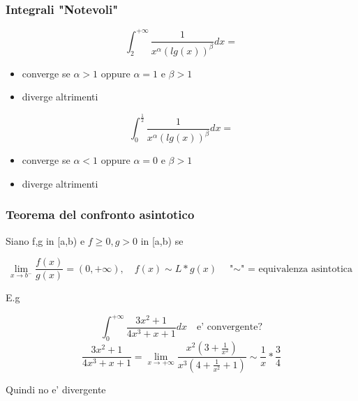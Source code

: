\documentclass{article}
\begin{document}
          \subsubsection{Integrali "Notevoli"}
          \begin{equation*}
            \int^{+\infty}_2 \frac{1}{x^{\alpha}(lg(x))^{\beta}}dx=
          \end{equation*}
          \begin{itemize}
            \item converge se $\alpha>1$ oppure $\alpha=1$ e $\beta>1$
            \item diverge altrimenti
          \end{itemize}
          \begin{equation*}
            \int^{\frac{1}{2}}_0 \frac{1}{x^{\alpha}(lg(x))^{\beta}}dx=
          \end{equation*}
          \begin{itemize}
            \item converge se $\alpha<1$ oppure $\alpha=0$ e $\beta>1$
            \item diverge altrimenti
          \end{itemize}
          \subsubsection{Teorema del confronto asintotico}
          \begin{flushleft}
            Siano f,g in [a,b) e $f\geq 0,g>0$ in [a,b) se
          \end{flushleft}
          \begin{equation*}
            \lim_{x\to b^-}\frac{f(x)}{g(x)}=(0,+\infty), \quad f(x) \sim L*g(x) \quad \text{"$\sim$" = equivalenza asintotica}
          \end{equation*}
          \begin{flushleft}
            E.g
          \end{flushleft}
          \begin{equation*}
            \int^{+\infty}_0 \frac{3x^2+1}{4x^3+x+1}dx \quad \text{e' convergente?}
          \end{equation*}
          \begin{equation*}
            \frac{3x^2+1}{4x^3+x+1}=\lim_{x \to +\infty} 
            \frac{x^2(3+\frac{1}{x^2})}{x^3(4+\frac{1}{x^2}+1)} \sim \frac{1}{x}*\frac{3}{4}
          \end{equation*}
          \begin{flushleft}
            Quindi no e' divergente
          \end{flushleft}
\end{document}
